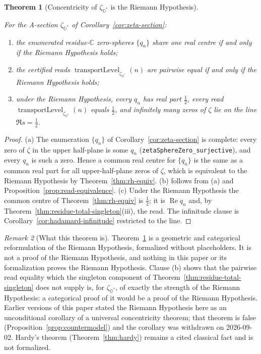 \documentclass[11pt]{article}
\newcommand{\OO}{\mathbb{O}}
\newcommand{\CC}{\mathbb{C}}
\newcommand{\Ostar}{\OO^{*}}
\newcommand{\zetaO}{\zeta_{\Ostar}}
\DeclareMathOperator{\re}{Re}
\providecommand{\lean}[1]{}
\providecommand{\leanok}{}
\providecommand{\uses}[1]{}
\theoremstyle{plain}
\newtheorem{theorem}{Theorem}[section]
\theoremstyle{definition}
\theoremstyle{remark}
\newtheorem{remark}[theorem]{Remark}
\begin{document}
\begin{theorem}[Concentricity of $\zetaO$ is the Riemann Hypothesis]\label{thm:zeta-concentricity-rh}
\lean{zetaSection_concentric_iff_RH, zetaSection_pairwiseTransportLevel_iff_RH,
zetaSection_sphereZero_re_eq_half_of_RH, zetaSection_transportLevel_eq_half_of_RH,
zeta_criticalLine_zeros_infinite_of_RH}
\leanok
\uses{cor:zeta-section, thm:rh-equiv, prop:read-equivalence, thm:residue-total-singleton,
thm:zero-spheres, cor:hadamard-infinitude}
For the A-section $\zetaO$ of Corollary~\ref{cor:zeta-section}:
\begin{enumerate}[leftmargin=2.4em]
\item[(a)] the enumerated residue-$\CC$ zero-spheres $\{q_n\}$ share one real centre if and only
  if the Riemann Hypothesis holds;
\item[(b)] the certified reads $\operatorname{transportLevel}_{\zetaO}(n)$ are pairwise equal if
  and only if the Riemann Hypothesis holds;
\item[(c)] under the Riemann Hypothesis, every $q_n$ has real part $\tfrac12$, every read
  $\operatorname{transportLevel}_{\zetaO}(n)$ equals $\tfrac12$, and infinitely many zeros of
  $\zeta$ lie on the line $\Re s=\tfrac12$.
\end{enumerate}
\end{theorem}
\begin{proof}
(a) The enumeration $\{q_n\}$ of Corollary~\ref{cor:zeta-section} is complete: every zero of
$\zeta$ in the upper half-plane is some $q_n$
\textup{(}\texttt{zetaSphereZero\_surjective}\textup{)}, and every $q_n$ is such a zero. Hence a
common real centre for $\{q_n\}$ is the same as a common real part for all upper-half-plane
zeros of $\zeta$, which is equivalent to the Riemann Hypothesis by Theorem~\ref{thm:rh-equiv}.
(b) follows from (a) and Proposition~\ref{prop:read-equivalence}. (c) Under the Riemann
Hypothesis the common centre of Theorem~\ref{thm:rh-equiv} is $\tfrac12$; it is $\re q_n$ and,
by Theorem~\ref{thm:residue-total-singleton}(iii), the read. The infinitude clause is
Corollary~\ref{cor:hadamard-infinitude} restricted to the line.
\end{proof}

\begin{remark}[What this theorem is]\label{rmk:reframing}
Theorem~\ref{thm:zeta-concentricity-rh} is a geometric and categorical reformulation of the
Riemann Hypothesis, formalized without placeholders. It is not a proof of the Riemann Hypothesis,
and nothing in this paper or its formalization proves the Riemann Hypothesis. Clause (b) shows
that the pairwise read equality which the singleton component of
Theorem~\ref{thm:residue-total-singleton} does not supply is, for $\zetaO$, of exactly the
strength of the Riemann Hypothesis: a categorical proof of it would be a proof of the Riemann
Hypothesis. Earlier versions of this paper stated the Riemann Hypothesis here as an
unconditional corollary of a universal concentricity theorem; that theorem is false
\textup{(}Proposition~\ref{prop:countermodel}\textup{)} and the corollary was withdrawn on
2026-09-02. Hardy's theorem (Theorem~\ref{thm:hardy}) remains a cited classical fact and is not
formalized.
\end{remark}
\end{document}
